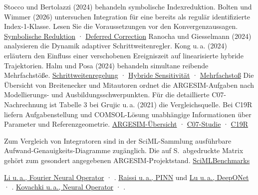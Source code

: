 Stocco und Bertolazzi (2024) behandeln symbolische Indexreduktion. Bolten und Wimmer (2026) untersuchen Integration für eine bereits als regulär identifizierte Index-1-Klasse. Lesen Sie die Voraussetzungen vor den Konvergenzaussagen. \href{https://doi.org/10.1016/j.cam.2024.115898}{Symbolische Reduktion} · \href{https://doi.org/10.1007/s10915-026-03385-7}{Deferred Correction}
Ranocha und Giesselmann (2024) analysieren die Dynamik adaptiver Schrittweitenregler. Kong u.\,a. (2024) erläutern den Einfluss einer verschobenen Ereigniszeit auf linearisierte hybride Trajektorien. Halm und Posa (2024) behandeln simultane reibende Mehrfachstöße. \href{https://doi.org/10.1007/s44207-024-00001-0}{Schrittweitenregelung} · \href{https://arxiv.org/abs/2306.06862}{Hybride Sensitivität} · \href{https://doi.org/10.1177/02783649241236860}{Mehrfachstoß}
Die Übersicht von Breitenecker und Mitautoren ordnet die ARGESIM-Aufgaben nach Modellierungs- und Ausbildungsschwerpunkten. Für die detaillierte C07-Nachrechnung ist Tabelle 3 bei Grujic u.\,a. (2021) die Vergleichsquelle. Bei C19R liefern Aufgabenstellung und COMSOL-Lösung unabhängige Informationen über Parameter und Referenzgeometrie. \href{https://www.sne-journal.org/fileadmin/user_upload_sne/SNE_Issues_OA/SNE_29_1/articles/sne.29.1.10468.bn.OA.pdf}{ARGESIM-Übersicht} · \href{https://doi.org/10.11128/sne.31.bne07.10589}{C07-Studie} · \href{https://www.argesim.org/benchmarks/c19}{C19R}

Zum Vergleich von Integratoren sind in der SciML-Sammlung ausführbare Aufwand-Genauigkeits-Diagramme zugänglich. Die auf S.\, abgedruckte Matrix gehört zum gesondert angegebenen ARGESIM-Projektstand. \href{https://docs.sciml.ai/SciMLBenchmarksOutput/stable/}{SciMLBenchmarks}

\href{https://openreview.net/pdf?id=c8P9NQVtmnO}{Li u.\,a., Fourier Neural Operator} · .
\href{https://doi.org/10.1016/j.jcp.2018.10.045}{Raissi u.\,a., PINN} und \href{https://www.nature.com/articles/s42256-021-00302-5}{Lu u.\,a., DeepONet} · .
\href{https://www.jmlr.org/papers/v24/21-1524.html}{Kovachki u.\,a., Neural Operator} · .

